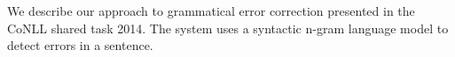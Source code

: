 We describe our approach to grammatical error correction presented in the CoNLL shared task 2014. The system uses a syntactic n-gram language model to detect errors in a sentence.
